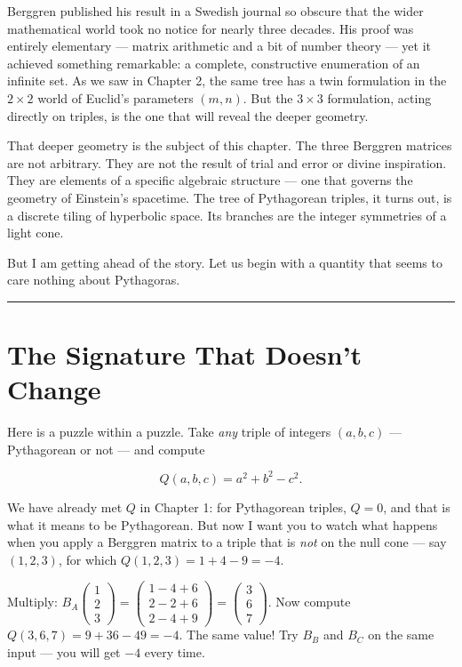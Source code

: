 \documentclass[12pt, letterpaper, openany]{book}
\theoremstyle{definition}
\theoremstyle{remark}
\begin{document}
Berggren published his result in a Swedish journal so obscure that the wider mathematical world took no notice for nearly three decades. His proof was entirely elementary --- matrix arithmetic and a bit of number theory --- yet it achieved something remarkable: a complete, constructive enumeration of an infinite set. As we saw in Chapter 2, the same tree has a twin formulation in the $2 \times 2$ world of Euclid's parameters $(m, n)$. But the $3 \times 3$ formulation, acting directly on triples, is the one that will reveal the deeper geometry.

That deeper geometry is the subject of this chapter. The three Berggren matrices are not arbitrary. They are not the result of trial and error or divine inspiration. They are elements of a specific algebraic structure --- one that governs the geometry of Einstein's spacetime. The tree of Pythagorean triples, it turns out, is a discrete tiling of hyperbolic space. Its branches are the integer symmetries of a light cone.

But I am getting ahead of the story. Let us begin with a quantity that seems to care nothing about Pythagoras.


\bigskip\noindent\rule{\textwidth}{0.4pt}\bigskip



\section*{The Signature That Doesn't Change}


Here is a puzzle within a puzzle. Take \textit{any} triple of integers $(a, b, c)$ --- Pythagorean or not --- and compute

\[
Q(a, b, c) = a^2 + b^2 - c^2.
\]

We have already met $Q$ in Chapter 1: for Pythagorean triples, $Q = 0$, and that is what it means to be Pythagorean. But now I want you to watch what happens when you apply a Berggren matrix to a triple that is \textit{not} on the null cone --- say $(1, 2, 3)$, for which $Q(1, 2, 3) = 1 + 4 - 9 = -4$.

Multiply: $B_A \begin{pmatrix} 1 \\ 2 \\ 3 \end{pmatrix} = \begin{pmatrix} 1 - 4 + 6 \\ 2 - 2 + 6 \\ 2 - 4 + 9 \end{pmatrix} = \begin{pmatrix} 3 \\ 6 \\ 7 \end{pmatrix}.$ Now compute $Q(3, 6, 7) = 9 + 36 - 49 = -4.$ The same value! Try $B_B$ and $B_C$ on the same input --- you will get $-4$ every time.
\end{document}

